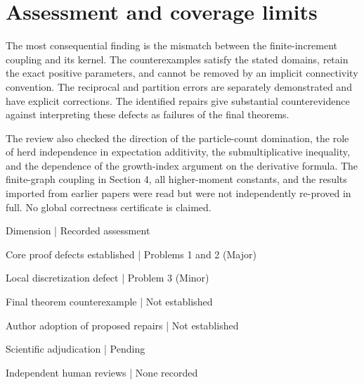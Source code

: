 \documentclass[10pt]{article}
\begin{document}
\section*{Assessment and coverage limits}
The most consequential finding is the mismatch between the finite-increment coupling and its kernel. The counterexamples satisfy the stated domains, retain the exact positive parameters, and cannot be removed by an implicit connectivity convention. The reciprocal and partition errors are separately demonstrated and have explicit corrections. The identified repairs give substantial counterevidence against interpreting these defects as failures of the final theorems.\par
The review also checked the direction of the particle-count domination, the role of herd independence in expectation additivity, the submultiplicative inequality, and the dependence of the growth-index argument on the derivative formula. The finite-graph coupling in Section 4, all higher-moment constants, and the results imported from earlier papers were read but were not independently re-proved in full. No global correctness certificate is claimed.\par
Dimension | Recorded assessment\par
Core proof defects established | Problems 1 and 2 (Major)\par
Local discretization defect | Problem 3 (Minor)\par
Final theorem counterexample | Not established\par
Author adoption of proposed repairs | Not established\par
Scientific adjudication | Pending\par
Independent human reviews | None recorded\par
\end{document}
